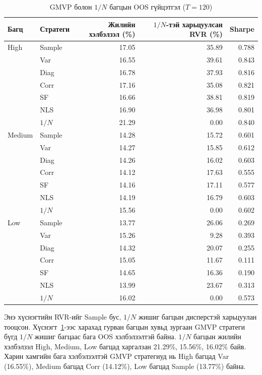 \begin{table}[htbp]
	\centering
	\caption{GMVP болон $1/N$ багцын OOS гүйцэтгэл ($T=120$)}
	\label{tab:equal_weight_comparison}
	\small
	\begin{tabular}{llrrr}
		\hline
		Багц & Стратеги &
		Жилийн хэлбэлзэл (\%) &
		$1/N$-тэй харьцуулсан RVR (\%) &
		Sharpe \\
		\hline
		High & Sample & 17.05 & 35.89 & 0.788 \\
		& Var & 16.55 & 39.61 & 0.843 \\
		& Diag & 16.78 & 37.93 & 0.816 \\
		& Corr & 17.16 & 35.08 & 0.821 \\
		& SF & 16.66 & 38.81 & 0.819 \\
		& NLS & 16.90 & 36.98 & 0.801 \\
		& $1/N$ & 21.29 & 0.00 & 0.840 \\
		\hline
		Medium & Sample & 14.28 & 15.72 & 0.601 \\
		& Var & 14.27 & 15.85 & 0.612 \\
		& Diag & 14.26 & 16.02 & 0.603 \\
		& Corr & 14.12 & 17.63 & 0.555 \\
		& SF & 14.16 & 17.11 & 0.577 \\
		& NLS & 14.19 & 16.79 & 0.603 \\
		& $1/N$ & 15.56 & 0.00 & 0.602 \\
		\hline
		Low & Sample & 13.77 & 26.06 & 0.269 \\
		& Var & 15.26 & 9.28 & 0.393 \\
		& Diag & 14.32 & 20.07 & 0.255 \\
		& Corr & 15.05 & 11.67 & 0.111 \\
		& SF & 14.65 & 16.36 & 0.190 \\
		& NLS & 13.99 & 23.67 & 0.313 \\
		& $1/N$ & 16.02 & 0.00 & 0.573 \\
		\hline
	\end{tabular}
\end{table}

Энэ хүснэгтийн RVR-ийг Sample бус, $1/N$
жишиг багцын дисперстэй харьцуулан тооцсон.
Хүснэгт~\ref{tab:equal_weight_comparison}-ээс
харахад гурван багцын хувьд зургаан GMVP
стратеги бүгд $1/N$ жишиг багцаас
бага OOS хэлбэлзэлтэй байна.
$1/N$ багцын жилийн хэлбэлзэл High,
Medium, Low багцад харгалзан
21.29\%, 15.56\%, 16.02\% байв.
Харин хамгийн бага хэлбэлзэлтэй
GMVP стратегиуд нь High багцад Var
(16.55\%), Medium багцад Corr (14.12\%),
Low багцад Sample (13.77\%) байна.

